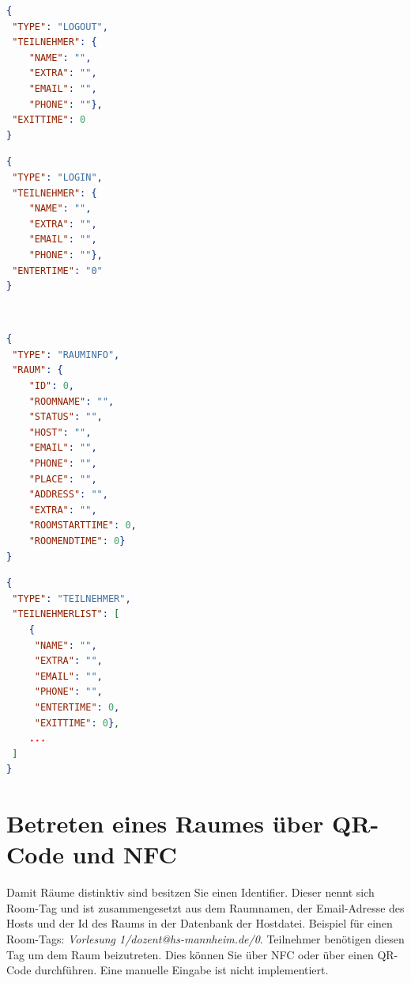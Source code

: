 \begin{minipage}[]{0.45\linewidth}
\begin{lstlisting}[language=json, label={lst:anmeldung}, caption={anmeldung.json}]
{
 "TYPE": "LOGOUT",
 "TEILNEHMER": {
	"NAME": "",
	"EXTRA": "",
	"EMAIL": "",
	"PHONE": ""},
 "EXITTIME": 0
}
\end{lstlisting}
\end{minipage}
\qquad
\begin{minipage}[]{0.45\linewidth}
\begin{lstlisting}[language=json,label={lst:abmeldung}, caption={abmeldung.json}]
{
 "TYPE": "LOGIN",
 "TEILNEHMER": {
	"NAME": "",
	"EXTRA": "",
	"EMAIL": "",
	"PHONE": ""},
 "ENTERTIME": "0"
}
\end{lstlisting}
\end{minipage}
\\
\begin{minipage}[]{0.45\linewidth}
\begin{lstlisting}[language=json, label={lst:rauminfo}, caption={rauminfo.json}]
{
 "TYPE": "RAUMINFO",
 "RAUM": {
	"ID": 0,
	"ROOMNAME": "",
	"STATUS": "",
	"HOST": "",
	"EMAIL": "",
	"PHONE": "",
	"PLACE": "",
	"ADDRESS": "",
	"EXTRA": "",
	"ROOMSTARTTIME": 0,
	"ROOMENDTIME": 0}
}
\end{lstlisting}
\end{minipage}
\qquad
\begin{minipage}[]{0.45\linewidth}
\begin{lstlisting}[language=json, label={lst:teilnehmer}, caption={teilnehmer.json}]
{
 "TYPE": "TEILNEHMER",
 "TEILNEHMERLIST": [
	{
	 "NAME": "",
	 "EXTRA": "",
 	 "EMAIL": "",
 	 "PHONE": "",
 	 "ENTERTIME": 0,
	 "EXITTIME": 0},
	...
 ]
}
\end{lstlisting}
\end{minipage}




\section{Betreten eines Raumes über QR-Code und NFC}
\label{sec:RoomTag - QR und NFC}
Damit Räume distinktiv sind besitzen Sie einen Identifier. Dieser nennt sich Room-Tag und ist zusammengesetzt aus dem Raumnamen, der Email-Adresse des Hosts und der Id des Raums in der Datenbank der Hostdatei. Beispiel für einen Room-Tags: \textit{Vorlesung 1/dozent@hs-mannheim.de/0}.
Teilnehmer benötigen diesen Tag um dem Raum beizutreten. Dies können Sie über NFC oder über einen QR-Code durchführen. Eine manuelle Eingabe ist nicht implementiert.

